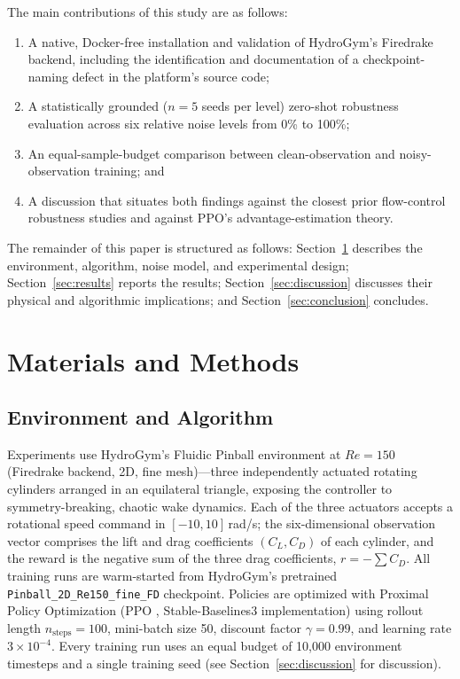 \documentclass[11pt,a4paper]{article}
\begin{document}
The main contributions of this study are as follows:
\begin{enumerate}
    \item A native, Docker-free installation and validation of HydroGym's Firedrake backend, including the identification and documentation of a checkpoint-naming defect in the platform's source code;
    \item A statistically grounded ($n=5$ seeds per level) zero-shot robustness evaluation across six relative noise levels from 0\% to 100\%;
    \item An equal-sample-budget comparison between clean-observation and noisy-observation training; and
    \item A discussion that situates both findings against the closest prior flow-control robustness studies and against PPO's advantage-estimation theory.
\end{enumerate}

The remainder of this paper is structured as follows: Section~\ref{sec:methods} describes the environment, algorithm, noise model, and experimental design; Section~\ref{sec:results} reports the results; Section~\ref{sec:discussion} discusses their physical and algorithmic implications; and Section~\ref{sec:conclusion} concludes.

\section{Materials and Methods}
\label{sec:methods}

\subsection{Environment and Algorithm}
Experiments use HydroGym's Fluidic Pinball environment at $Re=150$ (Firedrake backend, 2D, fine mesh)---three independently actuated rotating cylinders arranged in an equilateral triangle, exposing the controller to symmetry-breaking, chaotic wake dynamics. Each of the three actuators accepts a rotational speed command in $[-10, 10]$\,rad/s; the six-dimensional observation vector comprises the lift and drag coefficients $(C_L, C_D)$ of each cylinder, and the reward is the negative sum of the three drag coefficients, $r = -\sum C_D$. All training runs are warm-started from HydroGym's \cite{lagemann2026} pretrained \texttt{Pinball\_2D\_Re150\_fine\_FD} checkpoint. Policies are optimized with Proximal Policy Optimization (PPO \cite{schulman2017ppo}, Stable-Baselines3 implementation) using rollout length $n_{\text{steps}}=100$, mini-batch size 50, discount factor $\gamma=0.99$, and learning rate $3 \times 10^{-4}$. Every training run uses an equal budget of 10,000 environment timesteps and a single training seed (see Section~\ref{sec:discussion} for discussion).
\end{document}

